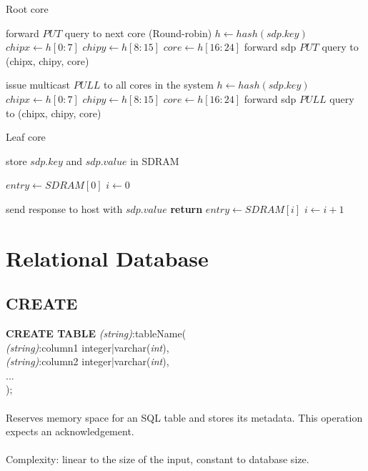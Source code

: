 \begin{algorithm}
\caption{Root core}
\label{alg:root}
\begin{algorithmic}[1]
			\State forward $PUT$ query to next core (Round-robin)
			\State $h \gets hash(sdp.key)$
			\State $chipx \gets h[0:7]$
			\State $chipy \gets h[8:15]$
			\State $core \gets h[16:24]$
			\State forward sdp $PUT$ query to (chipx, chipy, core)
		\EndIf
	\EndIf

			\State issue multicast $PULL$ to all cores in the system
			\State $h \gets hash(sdp.key)$
			\State $chipx \gets h[0:7]$
			\State $chipy \gets h[8:15]$
			\State $core \gets h[16:24]$
			\State forward sdp $PULL$ query to (chipx, chipy, core)
		\EndIf
	\EndIf
\EndProcedure
\end{algorithmic}
\end{algorithm}

\begin{algorithm}
\caption{Leaf core}
\label{alg:leaf}
\begin{algorithmic}[1]
		\State store $sdp.key$ and $sdp.value$ in SDRAM
	\EndIf

		\State $entry \gets SDRAM[0]$
		\State $i \gets 0$		
		
				\State send response to host with $sdp.value$
				\State \textbf{return}
			\EndIf
			\State $entry \gets SDRAM[i]$
			\State $i \gets i+1$
      	\EndWhile
	\EndIf
\EndProcedure
\end{algorithmic}
\end{algorithm}

\section{Relational Database}

\subsection{CREATE }
\noindent 
  {\large\textbf{CREATE TABLE} \textit{(string)}:tableName(\\
  	\textit{(string)}:column1 integer|varchar(\textit{int}),\\
  	\textit{(string)}:column2 integer|varchar(\textit{int}),\\
  	...\\
  	);}\\\\
\noindent
  Reserves memory space for an SQL table and stores its metadata. This operation expects an acknowledgement.\\\\
   Complexity: linear to the size of the input, constant to database size.\\\\
   
